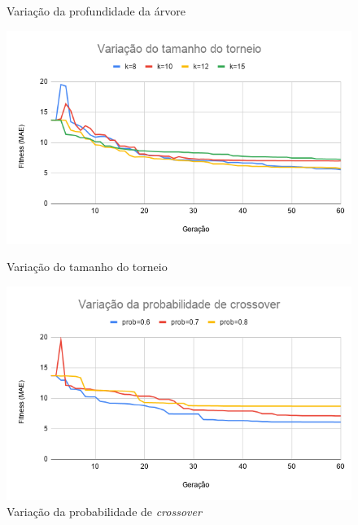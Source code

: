 \documentclass[a4paper]{article}
\begin{document}
\begin{figure}[h!]
\begin{minipage}{0.5\textwidth}
    \caption{Variação da profundidade da árvore}
    \label{fig:var_d}
  \end{minipage}
  \begin{minipage}{0.5\textwidth}
    \includegraphics[width=\textwidth]{var_k}
    \caption{Variação do tamanho do torneio}
    \label{fig:var_k}
  \end{minipage}
  \begin{minipage}{0.5\textwidth}
    \includegraphics[width=\textwidth]{var_pc}
    \caption{Variação da probabilidade de \textit{crossover}}
    \label{fig:var_pc}
  \end{minipage}
\end{figure}
\end{document}

